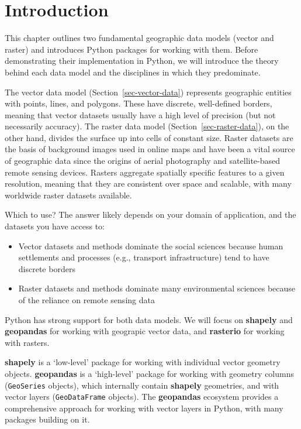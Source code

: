 \documentclass[
  letterpaper,
]{krantz}
\providecommand{\tightlist}{%
  \setlength{\itemsep}{0pt}\setlength{\parskip}{0pt}}\usepackage{longtable,booktabs,array}
\begin{document}
\section{Introduction}\label{introduction}

This chapter outlines two fundamental geographic data models (vector and
raster) and introduces Python packages for working with them. Before
demonstrating their implementation in Python, we will introduce the
theory behind each data model and the disciplines in which they
predominate.

The vector data model (Section~\ref{sec-vector-data}) represents
geographic entities with points, lines, and polygons. These have
discrete, well-defined borders, meaning that vector datasets usually
have a high level of precision (but not necessarily accuracy). The
raster data model (Section~\ref{sec-raster-data}), on the other hand,
divides the surface up into cells of constant size. Raster datasets are
the basis of background images used in online maps and have been a vital
source of geographic data since the origins of aerial photography and
satellite-based remote sensing devices. Rasters aggregate spatially
specific features to a given resolution, meaning that they are
consistent over space and scalable, with many worldwide raster datasets
available.

Which to use? The answer likely depends on your domain of application,
and the datasets you have access to:

\begin{itemize}
\tightlist
\item
  Vector datasets and methods dominate the social sciences because human
  settlements and processes (e.g., transport infrastructure) tend to
  have discrete borders
\item
  Raster datasets and methods dominate many environmental sciences
  because of the reliance on remote sensing data
\end{itemize}

Python has strong support for both data models. We will focus on
\textbf{shapely} and \textbf{geopandas} for working with geograpic
vector data, and \textbf{rasterio} for working with rasters.

\textbf{shapely} is a `low-level' package for working with individual
vector geometry objects. \textbf{geopandas} is a `high-level' package
for working with geometry columns (\texttt{GeoSeries} objects), which
internally contain \textbf{shapely} geometries, and with vector layers
(\texttt{GeoDataFrame} objects). The \textbf{geopandas} ecosystem
provides a comprehensive approach for working with vector layers in
Python, with many packages building on it.
\end{document}
